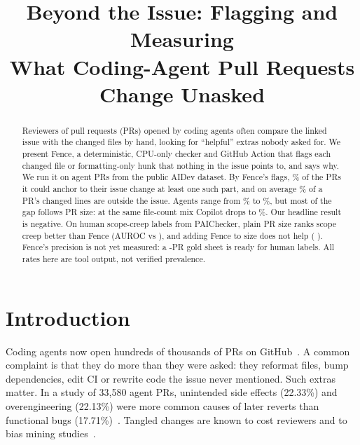 \documentclass[10pt,conference]{IEEEtran}
\begin{document}
\title{Beyond the Issue: Flagging and Measuring\\What Coding-Agent Pull Requests Change Unasked}
\author{}
\maketitle

\begin{abstract}\normalfont
Reviewers of pull requests (PRs) opened by coding agents often compare the linked issue with the changed files by hand, looking for ``helpful'' extras nobody asked for. We present Fence, a deterministic, CPU-only checker and GitHub Action that flags each changed file or formatting-only hunk that nothing in the issue points to, and says why. We run it on \nCorpus{} agent PRs from the public AIDev dataset. By Fence's flags, \pctReach\% of the PRs it could anchor to their issue change at least one such part, and on average \meanReach\% of a PR's changed lines are outside the issue. Agents range from \reachJules\% to \reachCopilot\%, but most of the gap follows PR size: at the same file-count mix Copilot drops to \stdCopilot\%. Our headline result is negative. On \nPai{} human scope-creep labels from PAIChecker, plain PR size ranks scope creep better than Fence (AUROC \aucSize{} vs \aucFence), and adding Fence to size does not help (\cvDelta{} \ciCvDelta). Fence's precision is not yet measured: a \goldPRs-PR gold sheet is ready for human labels. All rates here are tool output, not verified prevalence.
\end{abstract}

\section{Introduction}
Coding agents now open hundreds of thousands of PRs on GitHub~\cite{li2026aidev}. A common complaint is that they do more than they were asked: they reformat files, bump dependencies, edit CI or rewrite code the issue never mentioned. Such extras matter. In a study of 33{,}580 agent PRs, unintended side effects (22.33\%) and overengineering (22.13\%) were more common causes of later reverts than functional bugs (17.71\%)~\cite{oukhay2026revert}. Tangled changes are known to cost reviewers and to bias mining studies~\cite{herzig2013tangled}.
\end{document}
